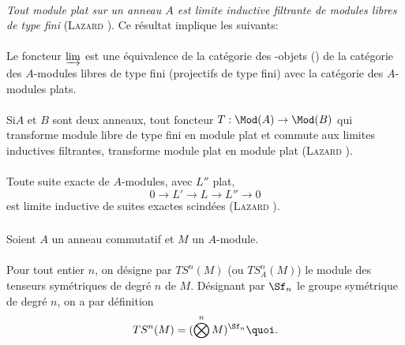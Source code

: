 \paragraph{}
\emph{Tout module plat sur un anneau $A$ est limite inductive
filtrante de modules libres de type fini} (\textsc{Lazard} \cite[I 1.2]{La}). Ce
résultat implique les suivants:

\paragraph{}
Le foncteur $\varinjlim$ est une équivalence de la catégorie des
\iInd-objets () de la catégorie des $A$-modules libres de type fini
(\resp projectifs de type fini) avec la catégorie des $A$-modules
plats.

\paragraph{}
Si\pageoriginale $A$ et $B$ sont deux anneaux, tout foncteur
$T:\Mod(A)\rightarrow \Mod(B)$ qui transforme module libre de type
fini en module plat et commute aux limites inductives filtrantes,
transforme module plat en module plat (\textsc{Lazard} \cite[I 1.5]{La}).

\paragraph{}
Toute suite exacte de $A$-modules, avec $L''$ plat,
$$
0\longrightarrow L'\longrightarrow L\longrightarrow L''\longrightarrow
0
$$
est limite inductive de suites exactes scindées (\textsc{Lazard} \cite[I 2.3]{La}).

\subsubsection{}
Soient $A$ un anneau commutatif et $M$ un $A$-module.

\paragraph{}
Pour tout entier $n$, on désigne par $TS^{n}(M)$ (ou $TS^{n}_A(M)$) le
module des tenseurs symétriques de degré $n$ de $M$. Désignant par
$\Sf_n$ le groupe symétrique de degré $n$, on a par définition
$$
TS^{n}(M)=(\bigotimes^{n}M)^{\Sf_n}{\quoi}.
$$

